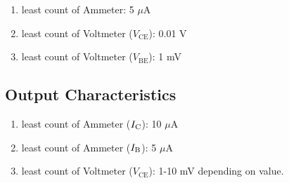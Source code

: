 \documentclass[%
sor,
 jor,
 amsmath,amssymb,
 reprint,
]{revtex4-2}
\begin{document}
\begin{enumerate}
	\item least count of Ammeter: 5 $\mu$A
	\item least count of Voltmeter ($V_\text{CE}$): 0.01 V
	\item least count of Voltmeter ($V_\text{BE}$): 1 mV
\end{enumerate}

\subsection{Output Characteristics}

\begin{enumerate}
	\item least count of Ammeter ($I_\text C$): 10 $\mu$A
	\item least count of Ammeter ($I_\text B$): 5 $\mu$A
	\item least count of Voltmeter ($V_\text{CE}$): 1-10 mV depending on value.
\end{enumerate}
\end{document}
